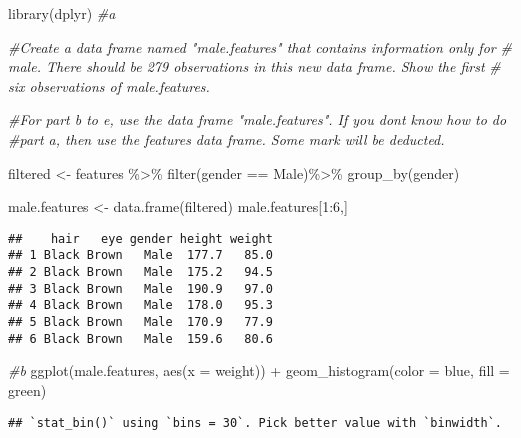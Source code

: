 \documentclass[
]{article}
\newenvironment{Shaded}{\begin{snugshade}}{\end{snugshade}}
\newcommand{\AttributeTok}[1]{\textcolor[rgb]{0.77,0.63,0.00}{#1}}
\newcommand{\CommentTok}[1]{\textcolor[rgb]{0.56,0.35,0.01}{\textit{#1}}}
\newcommand{\DecValTok}[1]{\textcolor[rgb]{0.00,0.00,0.81}{#1}}
\newcommand{\FunctionTok}[1]{\textcolor[rgb]{0.00,0.00,0.00}{#1}}
\newcommand{\NormalTok}[1]{#1}
\newcommand{\OtherTok}[1]{\textcolor[rgb]{0.56,0.35,0.01}{#1}}
\newcommand{\SpecialCharTok}[1]{\textcolor[rgb]{0.00,0.00,0.00}{#1}}
\newcommand{\StringTok}[1]{\textcolor[rgb]{0.31,0.60,0.02}{#1}}
\begin{document}
\begin{Shaded}
\begin{Highlighting}[]
\FunctionTok{library}\NormalTok{(dplyr)}
\CommentTok{\#a}

\CommentTok{\#Create a data frame named "male.features" that contains information only for }
 \CommentTok{\#  male. There should be 279 observations in this new data frame. Show the first}
  \CommentTok{\# six observations of male.features.}
   
\CommentTok{\#For part b to e, use the data frame "male.features". If you don\textquotesingle{}t know how to do}
\CommentTok{\#part a, then use the features data frame. Some mark will be deducted.}


\NormalTok{filtered }\OtherTok{\textless{}{-}}\NormalTok{ features }\SpecialCharTok{\%\textgreater{}\%} 
  \FunctionTok{filter}\NormalTok{(gender }\SpecialCharTok{==} \StringTok{\textquotesingle{}Male\textquotesingle{}}\NormalTok{)}\SpecialCharTok{\%\textgreater{}\%} 
  \FunctionTok{group\_by}\NormalTok{(gender) }

  
\NormalTok{male.features }\OtherTok{\textless{}{-}} \FunctionTok{data.frame}\NormalTok{(filtered)}
\NormalTok{male.features[}\DecValTok{1}\SpecialCharTok{:}\DecValTok{6}\NormalTok{,]}
\end{Highlighting}
\end{Shaded}

\begin{verbatim}
##    hair   eye gender height weight
## 1 Black Brown   Male  177.7   85.0
## 2 Black Brown   Male  175.2   94.5
## 3 Black Brown   Male  190.9   97.0
## 4 Black Brown   Male  178.0   95.3
## 5 Black Brown   Male  170.9   77.9
## 6 Black Brown   Male  159.6   80.6
\end{verbatim}

\begin{Shaded}
\begin{Highlighting}[]
\CommentTok{\#b}
\FunctionTok{ggplot}\NormalTok{(male.features, }\FunctionTok{aes}\NormalTok{(}\AttributeTok{x =}\NormalTok{ weight)) }\SpecialCharTok{+} 
  \FunctionTok{geom\_histogram}\NormalTok{(}\AttributeTok{color =} \StringTok{\textquotesingle{}blue\textquotesingle{}}\NormalTok{, }\AttributeTok{fill =} \StringTok{\textquotesingle{}green\textquotesingle{}}\NormalTok{)}
\end{Highlighting}
\end{Shaded}

\begin{verbatim}
## `stat_bin()` using `bins = 30`. Pick better value with `binwidth`.
\end{verbatim}
\end{document}
